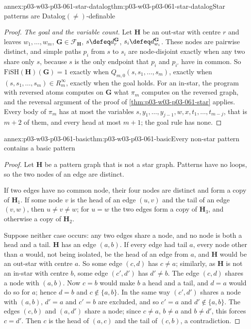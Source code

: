 \begin{annexitem}{annex:p03-w03-p03-061-star-datalog}{thm:p03-w03-p03-061-star-datalog}{Star patterns are Datalog\((\neq)\)-definable}
\begin{proof}
\emph{The goal and the variable count.} Let \(\mathbf H\) be an out-star
with centre \(r\) and leaves \(w_1,\ldots,w_m\), \(\mathbf G\in\mathcal
F_{\mathbf H}\), \(s\defeq d_r^{\mathbf G}\), \(s_i\defeq d_{w_i}^{\mathbf
G}\). These nodes are pairwise distinct, and simple paths \(p_i\) from \(s\)
to \(s_i\) are node-disjoint exactly when any two share only \(s\), because
\(s\) is the only endpoint that \(p_i\) and \(p_{i'}\) have in common. So
\(\mathrm{FiSH}(\mathbf H)(\mathbf G)=1\) exactly when
\(Q_{m,0}(s,s_1,\ldots,s_m)\), exactly when \((s,s_1,\ldots,s_m)\in
R_m^\infty\), exactly when the goal holds. For an in-star, the program with
reversed atoms computes on \(\mathbf G\) what \(\pi_m\) computes on the
reversed graph, and the reversal argument of the proof of
\cref{thm:p03-w03-p03-061-star} applies. Every body of \(\pi_m\) has at most
the variables \(s,y_1,\ldots,y_{j-1},w,x,t_1,\ldots,t_{m-j}\), that is
\(m+2\) of them, and every head at most \(m+1\); the goal rule has none.
\end{proof}
\end{annexitem}

\begin{annexitem}{annex:p03-w03-p03-061-basic}{thm:p03-w03-p03-061-basic}{Every non-star pattern contains a basic pattern}
\begin{proof}
Let \(\mathbf H\) be a pattern graph that is not a star graph. Patterns have
no loops, so the two nodes of an edge are distinct.

If two edges have no common node, their four nodes are distinct and form a
copy of \(\mathbf H_1\). If some node \(v\) is the head of an edge
\((u,v)\) and the tail of an edge \((v,w)\), then \(u\neq v\neq w\); for
\(u=w\) the two edges form a copy of \(\mathbf H_3\), and otherwise a copy
of \(\mathbf H_2\).

Suppose neither case occurs: any two edges share a node, and no node is both
a head and a tail. \(\mathbf H\) has an edge \((a,b)\). If every edge had
tail \(a\), every node other than \(a\) would, not being isolated, be the
head of an edge from \(a\), and \(\mathbf H\) would be an out-star with
centre \(a\). So some edge \((c,d)\) has \(c\neq a\); similarly, as
\(\mathbf H\) is not an in-star with centre \(b\), some edge \((c',d')\) has
\(d'\neq b\). The edge \((c,d)\) shares a node with \((a,b)\). Now \(c=b\)
would make \(b\) a head and a tail, and \(d=a\) would do so for \(a\);
hence \(d=b\) and \(c\notin\{a,b\}\). In the same way \((c',d')\) shares a
node with \((a,b)\), \(d'=a\) and \(c'=b\) are excluded, and so \(c'=a\) and
\(d'\notin\{a,b\}\). The edges \((c,b)\) and \((a,d')\) share a node; since
\(c\neq a\), \(b\neq a\) and \(b\neq d'\), this forces \(c=d'\). Then \(c\)
is the head of \((a,c)\) and the tail of \((c,b)\), a contradiction.
\end{proof}
\end{annexitem}

